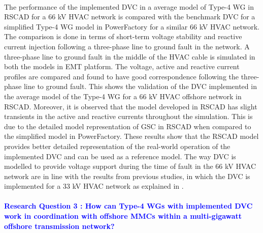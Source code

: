 \paragraph{} The performance of the implemented \gls{DVC} in a average model of Type-4 \gls{WG} in RSCAD for a 66 kV \gls{HVAC} network is compared with the benchmark \gls{DVC} for a simplified Type-4 \gls{WG} model in PowerFactory for a similar 66 kV \gls{HVAC} network. The comparison is done in terms of short-term voltage stability and reactive current injection following a three-phase line to ground fault in the network. A three-phase line to ground fault in the middle of the \gls{HVAC} cable is simulated in both the models in \gls{EMT} platform. The voltage, active and reactive current profiles are compared and found to have good correspondence following the three-phase line to ground fault. This shows the validation of the \gls{DVC} implemented in the average model of the Type-4 \gls{WG} for a 66 kV \gls{HVAC} offshore network in RSCAD. Moreover, it is observed that the model developed in RSCAD has slight transients in the active and reactive currents throughout the simulation. This is due to the detailed model representation of \gls{GSC} in RSCAD when compared to the simplified model in PowerFactory. These results show that the RSCAD model provides better detailed representation of the real-world operation of the implemented \gls{DVC} and can be used as a reference model. The way \gls{DVC} is modelled to provide voltage support during the time of fault in the 66 kV \gls{HVAC} network are in line with the results from previous studies, in which the \gls{DVC} is implemented for a 33 kV \gls{HVAC} network as explained in \cite{korai_dynamic_2019}.    




\paragraph{\textcolor{blue}{Research Question 3 : How can Type-4 \gls{WG}s with implemented \gls{DVC} work in coordination with offshore \gls{MMC}s within a multi-gigawatt offshore transmission network?}}

